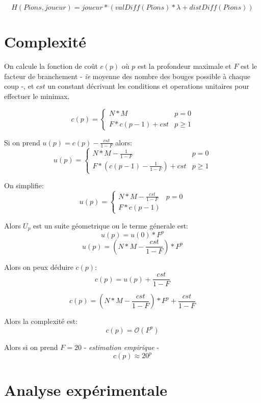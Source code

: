 \documentclass {article}
\begin{document}
\begin{equation*}
   H(Pions, joueur) = joueur * (valDiff(Pions) * \lambda + distDiff(Pions))
\end{equation*}

\section{Complexité}
On calcule la fonction de coût $c(p)$ où $p$ est la profondeur maximale et
$F$ est le facteur de branchement - \textit{ie} moyenne des nombre des bouges
possible à chaque coup -, et $cst$ un constant décrivant les conditions et
operations unitaires pour effectuer le minimax.

\begin{equation*}
   c(p) =
   \begin{cases}
      N * M            &  p = 0 \\
      F * c(p-1) + cst &  p \geq 1
   \end{cases}
\end{equation*}

Si on prend $u(p) = c(p) - \frac{cst}{1-F}$ alors:
\begin{equation*}
   u(p) =
   \begin{cases}
      N*M - \frac{1}{1-F}              & p = 0 \\
      F * (c(p-1) - \frac{1}{1-F}) + cst & p \geq 1
   \end{cases}
\end{equation*}

On simplifie:
\begin{equation*}
   u(p) =
   \begin{cases}
      N*M - \frac{cst}{1-F}  & p = 0 \\
      F * c(p-1)
   \end{cases}
\end{equation*}

Alors $U_p$ est un suite géometrique ou le terme génerale est:
\begin{equation*}
   u(p) = u(0) * F^p
\end{equation*}
\begin{equation*}
   u(p) = (N * M - \frac{cst}{1-F}) * F^p
\end{equation*}

Alors on peux déduire $c(p)$:
\begin{equation*}
   c(p) = u(p) + \frac{cst}{1-F}
\end{equation*}

\begin{equation*}
   c(p) = (N * M - \frac{cst}{1-F}) * F^p + \frac{cst}{1-F}
\end{equation*}

Alors la complexité est:
\begin{equation*}
   c(p) = \mathcal{O}(F^p)
\end{equation*}

Alors si on prend $F = 20$ - \textit{estimation empirique} -
\begin{equation}
   c(p) \approx 20^p
\end{equation}

\section{Analyse expérimentale}
\end{document}
